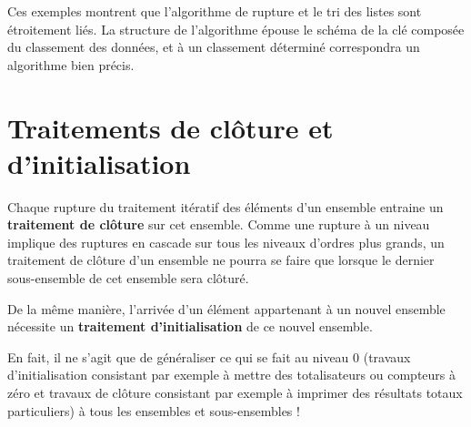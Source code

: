 	\begin{algo}
	\end{algo}

	Ces exemples montrent que l’algorithme de rupture 
	et le tri des listes sont étroitement liés. 
	La structure de l’algorithme épouse le schéma de la clé composée du classement des données,
	et à un classement déterminé correspondra un algorithme bien précis.

\section{Traitements de clôture et d’initialisation}

	Chaque rupture du traitement itératif des éléments d’un ensemble
	entraine un \textbf{traitement de clôture} sur cet ensemble. Comme une
	rupture à un niveau implique des ruptures en cascade sur tous les
	niveaux d’ordres plus grands, un traitement de clôture d’un ensemble ne
	pourra se faire que lorsque le dernier sous-ensemble de cet ensemble
	sera clôturé.
	
	De la même manière, l’arrivée d’un élément appartenant à un nouvel
	ensemble nécessite un \textbf{traitement d’initialisation} de ce nouvel
	ensemble.
	
	En fait, il ne s’agit que de généraliser ce qui se fait au niveau 0 
	(travaux d’initialisation consistant par exemple à mettre des totalisateurs 
	ou compteurs à zéro et travaux de clôture consistant par exemple 
	à imprimer des résultats totaux particuliers) 
	à tous les ensembles et sous-ensembles !

